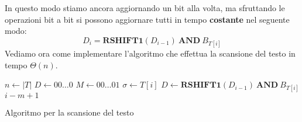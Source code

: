 In questo modo stiamo ancora aggiornando un bit alla volta, ma sfruttando le
operazioni bit a bit si possono aggiornare tutti in tempo \textbf{costante} nel
seguente modo:
\begin{equation}
    D_i = \textbf{RSHIFT1}(D_{i - 1}) \ \textbf{AND} \ B_{T[i]}
\end{equation}
Vediamo ora come implementare l'algoritmo che effettua la scansione del testo in
tempo $\Theta(n)$.
\begin{algorithm}
    \begin{algorithmic}
        \State $n \gets |T|$
        \State $D \gets 00\dots0$
        \State $M \gets 00\dots01$
        \State $\sigma \gets T[i]$
        \State $D \gets \textbf{RSHIFT1}(D_{i - 1}) \ \textbf{AND} \ B_{T[i]}$
        \State {} $i - m + 1$
        \EndIf
        \EndFor
        \EndFunction
    \end{algorithmic}
    \caption{Algoritmo per la scansione del testo}
\end{algorithm}
\newpage
